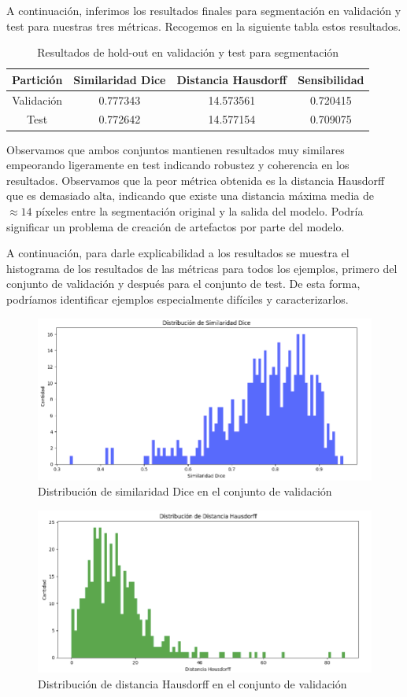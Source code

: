 A continuación, inferimos los resultados finales para segmentación en validación y test para nuestras tres métricas. Recogemos en la siguiente tabla estos resultados.

\begin{table}[H]
	\centering
	\begin{tabular}{|cccc|}
		\toprule
		Partición & Similaridad Dice & Distancia Hausdorff & Sensibilidad \\ 
		\midrule
		Validación & 0.777343 & 14.573561 & 0.720415 \\ 
		Test & 0.772642 & 14.577154 & 0.709075 \\ 
		\bottomrule
	\end{tabular}
	\caption{Resultados de hold-out en validación y test para segmentación}
	\label{tabla:resultados5}
\end{table}
Observamos que ambos conjuntos mantienen resultados muy similares empeorando ligeramente en test indicando robustez y coherencia en los resultados. Observamos que la peor métrica obtenida es la distancia Hausdorff que es demasiado alta, indicando que existe una distancia máxima media de $\approx 14$ píxeles entre la segmentación original y la salida del modelo. Podría significar un problema de creación de artefactos por parte del modelo.

A continuación, para darle explicabilidad a los resultados se muestra el histograma de los resultados de las métricas para todos los ejemplos, primero del conjunto de validación y después para el conjunto de test. De esta forma, podríamos identificar ejemplos especialmente difíciles y caracterizarlos.
\begin{figure}[H]
	\centering
	\includegraphics[width=0.7\linewidth]{imagenes/dist_dice_val.png}
	\caption{Distribución de similaridad Dice en el conjunto de validación}
\end{figure}

\begin{figure}[H]
	\centering
	\includegraphics[width=0.7\linewidth]{imagenes/dist_haus_val.png}
	\caption{Distribución de distancia Hausdorff en el conjunto de validación}
\end{figure}

